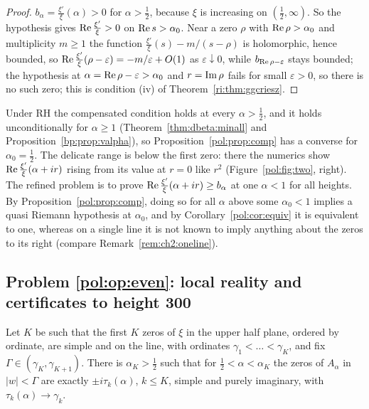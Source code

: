 \begin{proof}
$b_\alpha=\frac{\xi'}{\xi}(\alpha)>0$ for $\alpha>\frac12$, because $\xi$ is increasing on $(\frac12,\infty)$. So the hypothesis gives $\operatorname{Re}\frac{\xi'}{\xi}>0$ on $\operatorname{Re} s>\alpha_0$. Near a zero $\rho$ with $\operatorname{Re}\rho>\alpha_0$ and multiplicity $m\ge1$ the function $\frac{\xi'}{\xi}(s)-m/(s-\rho)$ is holomorphic, hence bounded, so $\operatorname{Re}\frac{\xi'}{\xi}(\rho-\varepsilon)=-m/\varepsilon+O(1)$ as $\varepsilon\downarrow0$, while $b_{\operatorname{Re}\rho-\varepsilon}$ stays bounded; the hypothesis at $\alpha=\operatorname{Re}\rho-\varepsilon>\alpha_0$ and $r=\operatorname{Im}\rho$ fails for small $\varepsilon>0$, so there is no such zero; this is condition (iv) of Theorem~\ref{ri:thm:ggcriesz}.
\end{proof}

Under RH the compensated condition holds at every $\alpha>\frac12$, and it holds unconditionally for $\alpha\ge1$ (Theorem~\ref{thm:dbeta:minall} and Proposition~\ref{bp:prop:valpha}), so Proposition~\ref{pol:prop:comp} has a converse for $\alpha_0=\frac12$. The delicate range is below the first zero: there the numerics show $\operatorname{Re}\frac{\xi'}{\xi}(\alpha+ir)$ rising from its value at $r=0$ like $r^2$ (Figure~\ref{pol:fig:two}, right). The refined problem is to prove $\operatorname{Re}\frac{\xi'}{\xi}(\alpha+ir)\ge b_\alpha$ at one $\alpha<1$ for all heights. By Proposition~\ref{pol:prop:comp}, doing so for all $\alpha$ above some $\alpha_0<1$ implies a quasi Riemann hypothesis at $\alpha_0$, and by Corollary~\ref{pol:cor:equiv} it is equivalent to one, whereas on a single line it is not known to imply anything about the zeros to its right (compare Remark~\ref{rem:ch2:oneline}).

\subsection{Problem \ref{pol:op:even}: local reality and certificates to height 300}

\begin{proposition}\label{pol:prop:local}
Let $K$ be such that the first $K$ zeros of $\xi$ in the upper half plane, ordered by ordinate, are simple and on the line, with ordinates $\gamma_1<\dots<\gamma_K$, and fix $\Gamma\in(\gamma_K,\gamma_{K+1})$. There is $\alpha_K>\frac12$ such that for $\frac12<\alpha<\alpha_K$ the zeros of $A_\alpha$ in $|w|<\Gamma$ are exactly $\pm i\tau_k(\alpha)$, $k\le K$, simple and purely imaginary, with $\tau_k(\alpha)\to\gamma_k$.
\end{proposition}

